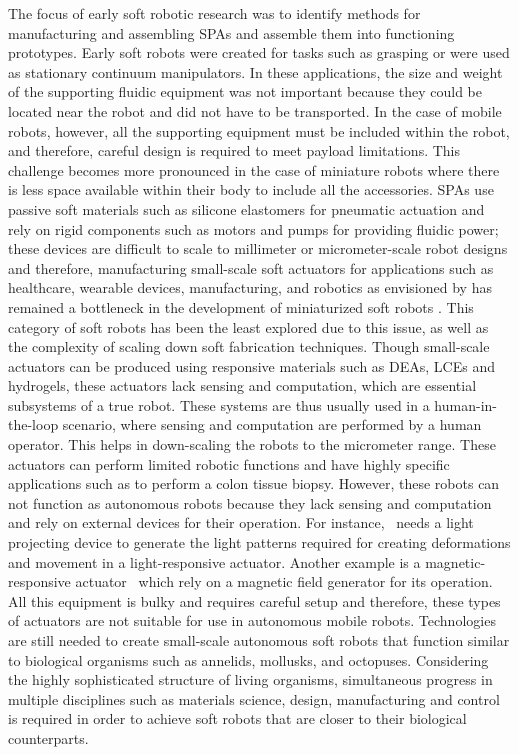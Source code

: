 The focus of early soft robotic research was to identify methods for manufacturing and assembling SPAs and assemble them into functioning prototypes. Early soft robots were created for tasks such as grasping or were used as stationary continuum manipulators. In these applications, the size and weight of the supporting fluidic equipment was not important because they could be located near the robot and did not have to be transported. In the case of mobile robots, however, all the supporting equipment must be included within the robot, and therefore, careful design is required to meet payload limitations. This challenge becomes more pronounced in the case of miniature robots where there is less space available within their body to include all the accessories. SPAs use passive soft materials such as silicone elastomers for pneumatic actuation and rely on rigid components such as motors and pumps for providing fluidic power; these devices are difficult to scale to millimeter or micrometer-scale robot designs and therefore, manufacturing small-scale soft actuators for applications such as healthcare, wearable devices, manufacturing, and robotics as envisioned by \cite{Hines2017} has remained a bottleneck in the development of miniaturized soft robots \cite{Majidi2019}. This category of soft robots has been the least explored due to this issue, as well as the complexity of scaling down soft fabrication techniques. Though small-scale actuators can be produced using responsive materials such as DEAs, LCEs and hydrogels, these actuators lack sensing and computation, which are essential subsystems of a true robot. These systems are thus usually used in a human-in-the-loop scenario, where sensing and computation are performed by a human operator. This helps in down-scaling the robots to the micrometer range. These actuators can perform limited robotic functions and have highly specific applications such as to perform a colon tissue biopsy. However, these robots can not function as autonomous robots because they lack sensing and computation and rely on external devices for their operation. For instance,~\cite{Palagi2016} needs a light projecting device to generate the light patterns required for creating deformations and movement in a light-responsive actuator. Another example is a magnetic-responsive actuator~\cite{Kim2018} which rely on a magnetic field generator for its operation. All this equipment is bulky and requires careful setup and therefore, these types of actuators are not suitable for use in autonomous mobile robots. Technologies are still needed to create small-scale autonomous soft robots that function similar to biological organisms such as annelids, mollusks, and octopuses. Considering the highly sophisticated structure of living organisms, simultaneous progress in multiple disciplines such as materials science, design, manufacturing and control is required in order to achieve soft robots that are closer to their biological counterparts.

